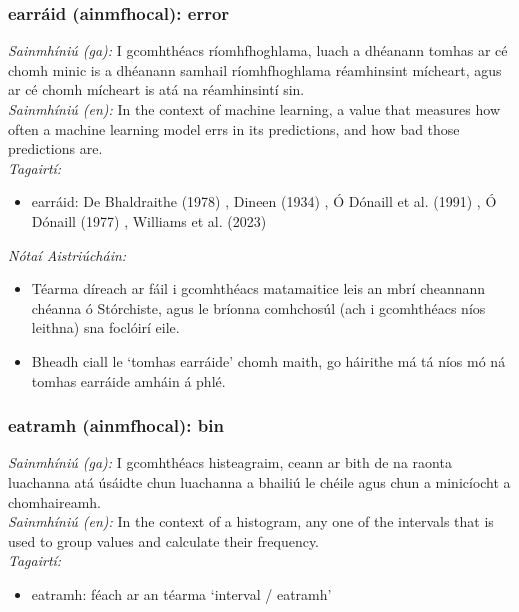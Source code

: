 \subsubsection*{earráid (ainmfhocal): error}
 \noindent \textit{Sainmhíniú (ga):} I gcomhthéacs ríomhfhoghlama, luach a dhéanann tomhas ar cé chomh minic is a dhéanann samhail ríomhfhoghlama réamhinsint mícheart, agus ar cé chomh mícheart is atá na réamhinsintí sin.
\\
 \noindent \textit{Sainmhíniú (en):} In the context of machine learning, a value that measures how often a machine learning model errs in its predictions, and how bad those predictions are.
\\
 \noindent \textit{Tagairtí:}
\begin{itemize}
	\item earráid: De Bhaldraithe (1978) \cite{de-bhaldraithe}, Dineen (1934) \cite{dineen}, Ó Dónaill et al. (1991) \cite{focloir-beag}, Ó Dónaill (1977) \cite{odonaill}, Williams et al. (2023) \cite{storchiste}
\end{itemize}

 \noindent \textit{Nótaí Aistriúcháin:}
\begin{itemize}
	\item Téarma díreach ar fáil i gcomhthéacs matamaitice leis an mbrí cheannann chéanna ó Stórchiste, agus le bríonna comhchosúl (ach i gcomhthéacs níos leithna) sna foclóirí eile.
	\item Bheadh ciall le `tomhas earráide' chomh maith, go háirithe má tá níos mó ná tomhas earráide amháin á phlé.
\end{itemize}


\subsubsection*{eatramh (ainmfhocal): bin}
 \noindent \textit{Sainmhíniú (ga):} I gcomhthéacs histeagraim, ceann ar bith de na raonta luachanna atá úsáidte chun luachanna a bhailiú le chéile agus chun a minicíocht a chomhaireamh.
\\
 \noindent \textit{Sainmhíniú (en):} In the context of a histogram, any one of the intervals that is used to group values and calculate their frequency.
\\
 \noindent \textit{Tagairtí:}
\begin{itemize}
	\item eatramh: féach ar an téarma `interval / eatramh'
\end{itemize}

